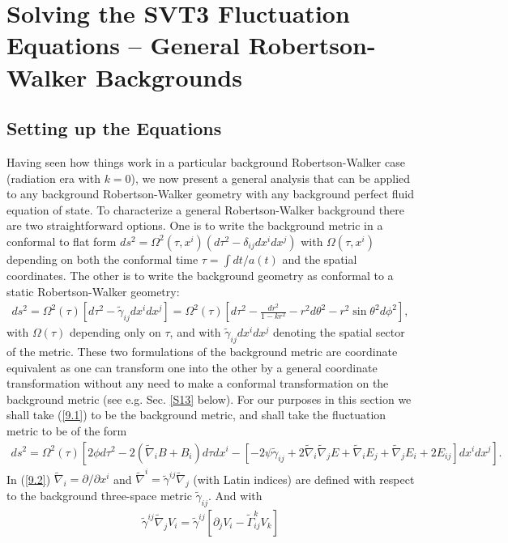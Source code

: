 \documentclass[aps,onecolumn,10pt]{revtex4}
\numberwithin{equation}{section}
\numberwithin{equation}{section}
\begin{document}
\section{Solving the SVT3 Fluctuation Equations --  General Robertson-Walker Backgrounds}
\label{S9}
\subsection{Setting up the Equations}


Having seen how things work in a particular background Robertson-Walker case (radiation era with $k=0$), we now present a general analysis that can be applied to any background Robertson-Walker geometry with any background perfect fluid equation of state. To characterize a general Robertson-Walker background there are two straightforward options. One is to write the background metric in a conformal to flat form $ds^2=\Omega^2(\tau,x^i)(d\tau^2-\delta_{ij}dx^idx^j)$ with $\Omega(\tau,x^i)$ depending on both the conformal time $\tau=\int dt/a(t)$ and the spatial coordinates. The other is to write the background geometry as conformal to a static Robertson-Walker geometry: 
%
\begin{eqnarray}
ds^2=\Omega^2(\tau)[d\tau^2-\tilde{\gamma}_{ij}dx^idx^j]=\Omega^2(\tau)\left[ d\tau^2-\frac{dr^2}{1-kr^2}-r^2d\theta^2-r^2\sin\theta^2d\phi^2\right],
\label{9.1}
\end{eqnarray}
%
with $\Omega(\tau)$ depending only on $\tau$, and with $\tilde{\gamma}_{ij}dx^idx^j$ denoting the spatial sector of the metric. These two formulations of the background metric are coordinate equivalent as one can transform one into the other by a general coordinate transformation without any need to make a conformal transformation on the background metric (see e.g. Sec. \ref{S13} below). For our purposes in this section we shall take (\ref{9.1}) to be the background metric, and shall take the fluctuation metric to be of the form
%
\begin{eqnarray}
ds^2=\Omega^2(\tau)\left[2\phi d\tau^2 -2(\tilde{\nabla}_i B +B_i)d\tau dx^i - [-2\psi\tilde{\gamma}_{ij} +2\tilde{\nabla}_i\tilde{\nabla}_j E + \tilde{\nabla}_i E_j + \tilde{\nabla}_j E_i + 2E_{ij}]dx^i dx^j\right].
\label{9.2}
\end{eqnarray}
%
In (\ref{9.2})  $\tilde{\nabla}_i=\partial/\partial x^i$ and  $\tilde{\nabla}^i=\tilde{\gamma}^{ij}\tilde{\nabla}_j$  (with Latin indices) are defined with respect to the background three-space metric $\tilde{\gamma}_{ij}$. And with
%
\begin{eqnarray}
\tilde{\gamma}^{ij}\tilde{\nabla}_j V_i=\tilde{\gamma}^{ij}[\partial_j V_i-\tilde{\Gamma}^{k}_{ij}V_k]
\label{9.3}
\end{eqnarray}
\end{document}
